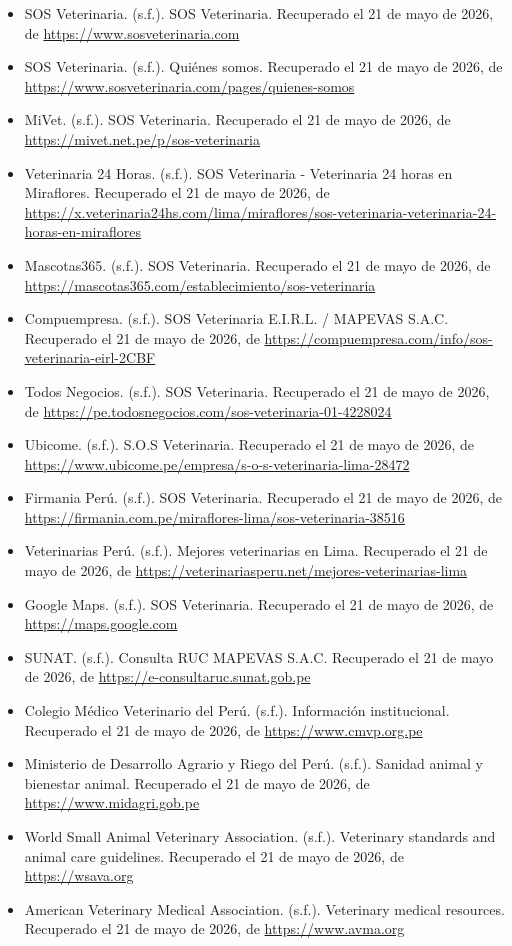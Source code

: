 \begin{itemize}
	\item SOS Veterinaria. (s.f.). SOS Veterinaria. Recuperado el 21 de mayo de 2026, de \url{https://www.sosveterinaria.com}
	\item SOS Veterinaria. (s.f.). Quiénes somos. Recuperado el 21 de mayo de 2026, de \url{https://www.sosveterinaria.com/pages/quienes-somos}
	\item MiVet. (s.f.). SOS Veterinaria. Recuperado el 21 de mayo de 2026, de \url{https://mivet.net.pe/p/sos-veterinaria}
	\item Veterinaria 24 Horas. (s.f.). SOS Veterinaria - Veterinaria 24 horas en Miraflores. Recuperado el 21 de mayo de 2026, de \url{https://x.veterinaria24hs.com/lima/miraflores/sos-veterinaria-veterinaria-24-horas-en-miraflores}
	\item Mascotas365. (s.f.). SOS Veterinaria. Recuperado el 21 de mayo de 2026, de \url{https://mascotas365.com/establecimiento/sos-veterinaria}
	\item Compuempresa. (s.f.). SOS Veterinaria E.I.R.L. / MAPEVAS S.A.C. Recuperado el 21 de mayo de 2026, de \url{https://compuempresa.com/info/sos-veterinaria-eirl-2CBF}
	\item Todos Negocios. (s.f.). SOS Veterinaria. Recuperado el 21 de mayo de 2026, de \url{https://pe.todosnegocios.com/sos-veterinaria-01-4228024}
	\item Ubicome. (s.f.). S.O.S Veterinaria. Recuperado el 21 de mayo de 2026, de \url{https://www.ubicome.pe/empresa/s-o-s-veterinaria-lima-28472}
	\item Firmania Perú. (s.f.). SOS Veterinaria. Recuperado el 21 de mayo de 2026, de \url{https://firmania.com.pe/miraflores-lima/sos-veterinaria-38516}
	\item Veterinarias Perú. (s.f.). Mejores veterinarias en Lima. Recuperado el 21 de mayo de 2026, de \url{https://veterinariasperu.net/mejores-veterinarias-lima}
	\item Google Maps. (s.f.). SOS Veterinaria. Recuperado el 21 de mayo de 2026, de \url{https://maps.google.com}
	\item SUNAT. (s.f.). Consulta RUC MAPEVAS S.A.C. Recuperado el 21 de mayo de 2026, de \url{https://e-consultaruc.sunat.gob.pe}
	\item Colegio Médico Veterinario del Perú. (s.f.). Información institucional. Recuperado el 21 de mayo de 2026, de \url{https://www.cmvp.org.pe}
	\item Ministerio de Desarrollo Agrario y Riego del Perú. (s.f.). Sanidad animal y bienestar animal. Recuperado el 21 de mayo de 2026, de \url{https://www.midagri.gob.pe}
	\item World Small Animal Veterinary Association. (s.f.). Veterinary standards and animal care guidelines. Recuperado el 21 de mayo de 2026, de \url{https://wsava.org}
	\item American Veterinary Medical Association. (s.f.). Veterinary medical resources. Recuperado el 21 de mayo de 2026, de \url{https://www.avma.org}
\end{itemize}


